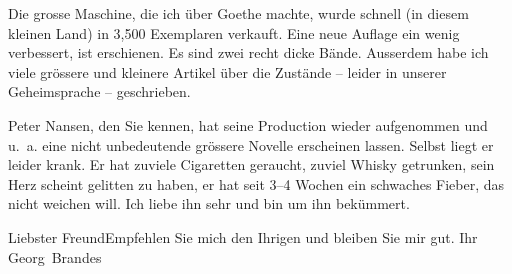\pstart
           Die grosse Maschine, die ich
               über Goethe machte, wurde schnell (in diesem
               kleinen Land) in 3,500
               Exemplaren verkauft. Eine neue Auflage ein wenig verbessert, ist erschienen. Es sind
               zwei recht dicke Bände. Ausserdem habe ich viele grössere und kleinere Artikel über
               die Zustände – leider in unserer Geheimsprache – geschrieben.\pend
           
\pstart
           Peter Nansen, den Sie kennen, hat seine
               Production wieder aufgenommen und u. a. eine nicht unbedeutende grössere Novelle erscheinen lassen.
               Selbst liegt er leider krank. Er hat zuviele {\pb}Cigaretten geraucht, zuviel Whisky
               getrunken, sein Herz scheint gelitten zu haben, er hat seit 3–4 Wochen ein schwaches Fieber, das nicht weichen will. Ich liebe
               ihn sehr und bin um ihn bekümmert.\pend
           
\pstart
           Liebster Freund\hspace*{1.5em}Empfehlen Sie mich den Ihrigen und
               bleiben Sie mir gut.\pend
           \pstart Ihr \spacefill\mbox{Georg Brandes}\pend{}\endnumbering{}  \newcommand{\dateiname}{L02221}\newcommand{\titel}{Georg Brandes an Arthur Schnitzler, 4. 12. 1915}\newcommand{\editorInnen}{Martin Anton Müller und Gerd-Hermann Susen}
